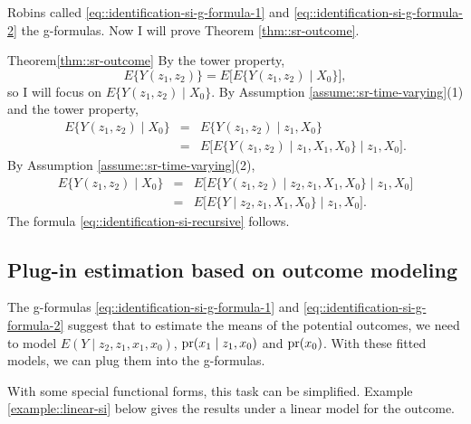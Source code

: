 Robins called \eqref{eq::identification-si-g-formula-1} and \eqref{eq::identification-si-g-formula-2} the g-formulas. 
Now I will prove Theorem  \ref{thm::sr-outcome}. 
 

\begin{myproof}{Theorem}{\ref{thm::sr-outcome}}
By the tower property, 
$$
E\{ Y(z_1, z_2) \}  = E \Big[  E\{ Y(z_1, z_2) \mid X_0 \}  \Big ],
$$
so I will focus on $E\{ Y(z_1, z_2) \mid X_0 \}$. 
By Assumption \ref{assume::sr-time-varying}(1) and the tower property,
\begin{eqnarray*}
E\{ Y(z_1, z_2) \mid X_0 \} &=& E\{ Y(z_1, z_2) \mid  z_1, X_0 \} \\
&=& E\Big [ E\{ Y(z_1, z_2) \mid   z_1, X_1, X_0 \} \mid   z_1, X_0  \Big].
\end{eqnarray*}
By Assumption \ref{assume::sr-time-varying}(2),
\begin{eqnarray*}
E\{ Y(z_1, z_2) \mid X_0 \}  
&=& E\Big [ E\{ Y(z_1, z_2) \mid z_2,   z_1,X_1, X_0 \} \mid  z_1, X_0  \Big] \\
&=& E\Big [ E\{ Y \mid z_2, z_1, X_1, X_0 \} \mid   z_1, X_0  \Big] .
\end{eqnarray*}
The formula \eqref{eq::identification-si-recursive} follows. 
\end{myproof}



\subsection{Plug-in estimation based on outcome modeling}
\label{section::si-plug-in-outcome}

The g-formulas \eqref{eq::identification-si-g-formula-1} and \eqref{eq::identification-si-g-formula-2} suggest that to estimate the means of the potential outcomes, we need to model $E(Y\mid z_2,z_1, x_1, x_0)$, $\textup{pr}(x_1\mid z_1,x_0)$ and $\textup{pr}(x_0)$. With these fitted models, we can plug them into the g-formulas. 

With some special functional forms, this task can be simplified. Example \ref{example::linear-si} below gives the results under a linear model for the outcome. 


